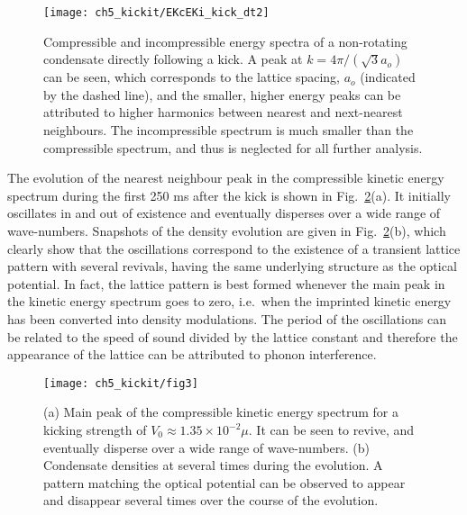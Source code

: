 \begin{figure}[ht]
    \centering
    \texttt{[image: ch5\_kickit/EKcEKi\_kick\_dt2]}
    \caption[Time-averaged compressible and incompressible energy spectra of a non-rotating condensate directly following a kick.]{Compressible and incompressible energy spectra of a non-rotating condensate directly following a kick. A peak at $k=4\pi/(\sqrt{3}a_o)$ can be seen, which corresponds to the lattice spacing, $a_o$ (indicated by the dashed line), and the smaller, higher energy peaks can be attributed to higher harmonics between nearest and next-nearest neighbours. The incompressible spectrum is much smaller than the compressible spectrum, and thus is neglected for all further analysis.}
    \label{fig:ekc_eki_novtx}
\end{figure}


The evolution of the nearest neighbour peak in the compressible kinetic energy spectrum during the first 250 ms after the kick is shown in Fig.~\ref{fig:novtx_p5k}(a). It initially oscillates in and out of existence and eventually disperses over a wide range of wave-numbers. Snapshots of the density evolution are given in Fig.~\ref{fig:novtx_p5k}(b), which clearly show that the oscillations correspond to the existence of a transient lattice pattern with several revivals, having the same underlying structure as the optical potential. In fact, the lattice pattern is best formed whenever the main peak in the kinetic energy spectrum goes to zero, i.e.~when the imprinted kinetic energy has been converted into density modulations. The period of the oscillations can be related to the speed of sound divided by the lattice constant and therefore the appearance of the lattice can be attributed to phonon interference.

\begin{figure}[ht]
    \centering

	\texttt{[image: ch5\_kickit/fig3]}
	\caption[Effect of kicking on non-rotating condensate.]{(a) Main peak of the compressible kinetic energy spectrum for a kicking strength of $V_0 \approx 1.35\times10^{-2}\mu$. It can be seen to revive, and eventually disperse over a wide range of wave-numbers.  (b) Condensate densities at several times during the evolution. A pattern matching the optical potential can be observed to appear and disappear several times over the course of the evolution.}
	\label{fig:novtx_p5k}
\end{figure}


